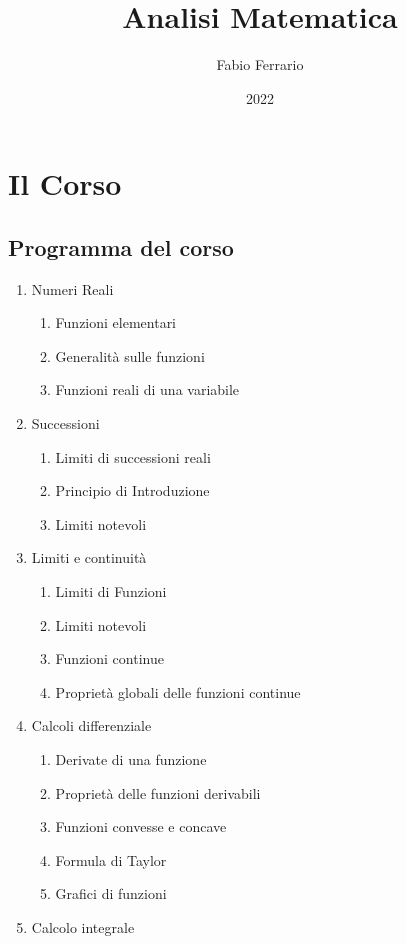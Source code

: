 \documentclass[12pt, a4paper, openany]{book}
\begin{document}
\title{Analisi Matematica}
\author{Fabio Ferrario}
\date{2022}
\maketitle

\tableofcontents

\chapter{Il Corso}
\section{Programma del corso}
\begin{enumerate}
\item Numeri Reali
\begin{enumerate}
\item Funzioni elementari
\item Generalità sulle funzioni
\item Funzioni reali di una variabile
\end{enumerate}
\item Successioni
\begin{enumerate}
    \item Limiti di successioni reali
    \item Principio di Introduzione
    \item Limiti notevoli
\end{enumerate}
\item Limiti e continuità
\begin{enumerate}
    \item Limiti di Funzioni
    \item Limiti notevoli
    \item Funzioni continue
    \item Proprietà globali delle funzioni continue
\end{enumerate}
\item Calcoli differenziale
\begin{enumerate}
    \item Derivate di una funzione
    \item Proprietà delle funzioni derivabili
    \item Funzioni convesse e concave
    \item Formula di Taylor
    \item Grafici di funzioni
\end{enumerate}
\item Calcolo integrale

\end{enumerate}
\end{document}
